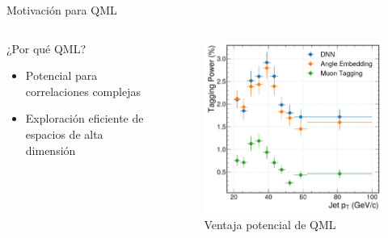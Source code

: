 \documentclass[aspectratio=43]{beamer}
\begin{document}
\begin{frame}{Motivación para QML}
  \begin{columns}[T]
    \begin{column}{0.5\textwidth}
      \begin{alertblock}{¿Por qué QML?}
        \begin{itemize}
          \item Potencial para correlaciones complejas
          \item Exploración eficiente de espacios de alta dimensión
        \end{itemize}
      \end{alertblock}
    \end{column}
    
    \begin{column}{0.5\textwidth}
      \begin{figure}
        \includegraphics[width=\textwidth]{motiv.png}
        \caption{Ventaja potencial de QML}
      \end{figure}
    \end{column}
  \end{columns}
\end{frame}

\end{document}

